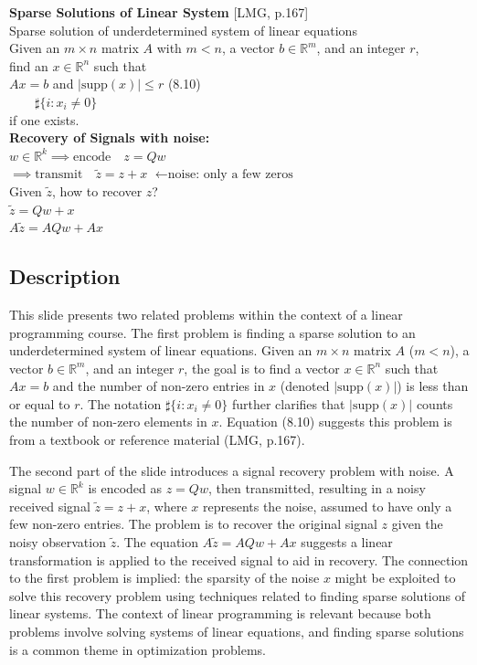 \documentclass{article}%
\begin{document}
\textbf{Sparse Solutions of Linear System} [LMG, p.167] \\
Sparse solution of underdetermined system of linear equations \\
Given an $m \times n$ matrix $A$ with $m < n$, a vector $b \in \mathbb{R}^m$, and an integer $r$, \\
find an $x \in \mathbb{R}^n$ such that \\
$Ax = b$ and $|\text{supp}(x)| \le r$ \quad (8.10) \\
$\qquad \sharp \{ i : x_i \ne 0 \}$ \\
if one exists. \\
\textbf{Recovery of Signals with noise:} \\
$w \in \mathbb{R}^k \implies \text{encode} \quad z = Qw$ \\
$\implies \text{transmit} \quad \tilde{z} = z + x$ \quad $\leftarrow \text{noise: only a few zeros}$ \\
Given $\tilde{z}$, how to recover $z$? \\
$\tilde{z} = Qw + x$ \\
$A\tilde{z} = AQw + Ax$
%
\subsection{Description}%
This slide presents two related problems within the context of a linear programming course. The first problem is finding a sparse solution to an underdetermined system of linear equations.  Given an $m \times n$ matrix $A$ ($m < n$), a vector $b \in \mathbb{R}^m$, and an integer $r$, the goal is to find a vector $x \in \mathbb{R}^n$ such that $Ax = b$ and the number of non-zero entries in $x$ (denoted $|\text{supp}(x)|$) is less than or equal to $r$.  The notation $\sharp \{ i : x_i \ne 0 \}$ further clarifies that $|\text{supp}(x)|$ counts the number of non-zero elements in $x$. Equation (8.10) suggests this problem is from a textbook or reference material (LMG, p.167).

The second part of the slide introduces a signal recovery problem with noise. A signal $w \in \mathbb{R}^k$ is encoded as $z = Qw$, then transmitted, resulting in a noisy received signal $\tilde{z} = z + x$, where $x$ represents the noise, assumed to have only a few non-zero entries. The problem is to recover the original signal $z$ given the noisy observation $\tilde{z}$.  The equation $A\tilde{z} = AQw + Ax$ suggests a linear transformation is applied to the received signal to aid in recovery. The connection to the first problem is implied: the sparsity of the noise $x$ might be exploited to solve this recovery problem using techniques related to finding sparse solutions of linear systems.  The context of linear programming is relevant because both problems involve solving systems of linear equations, and finding sparse solutions is a common theme in optimization problems.%
\end{document}
